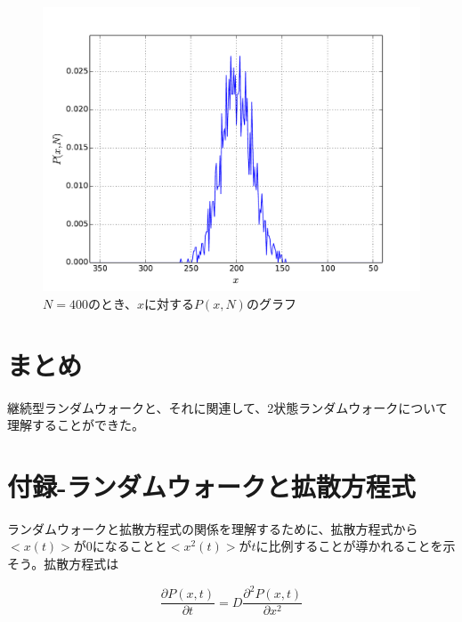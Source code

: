 \documentclass{jsarticle}
\begin{document}
\begin{enumerate}
\begin{enumerate}
                                
                    \begin{figure}[H]
                        \begin{center}
                            \includegraphics[width=12.5cm]{figure_6.pdf}
                            \caption{$N=400$のとき、$x$に対する$P(x,N)$のグラフ}
                            \label{fig:5}
                        \end{center}
                    \end{figure}
                    
                \end{enumerate}
                
                            
        \end{enumerate}
    
    \section{まとめ}
    
        継続型ランダムウォークと、それに関連して、2状態ランダムウォークについて理解することができた。
        
    \section{付録-ランダムウォークと拡散方程式}
        
        ランダムウォークと拡散方程式の関係を理解するために、拡散方程式から$<x(t)>$が$0$になることと$<x^{2}(t)>$が$t$に比例することが導かれることを示そう。拡散方程式は
        
        \begin{equation}
            \frac{\partial P(x,t)}{\partial t} = D \frac{\partial^{2} P(x,t)}{\partial x^{2}}
            \label{eq:12-4-e1}
        \end{equation}
        
\end{document}
